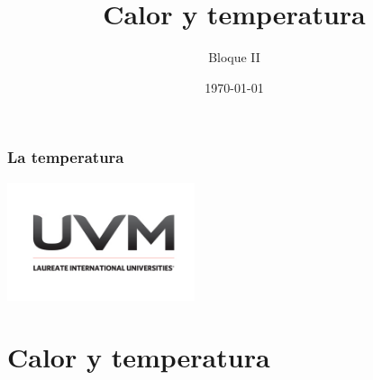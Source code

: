 \documentclass[handout]{beamer}
\title{Calor y temperatura}
\author{Bloque II}
\institute[FC UNAM]{Preparatoria \\ Universidad del Valle de México}
\date{\today}
\begin{document}
\frametitle{La temperatura}

\begin{frame}[noframenumbering]
  \titlepage
  \begin{center}
    \includegraphics[width=5.5cm]{uvm1}    
  \end{center}  
\end{frame}


\section{Calor y temperatura}
\end{document}
